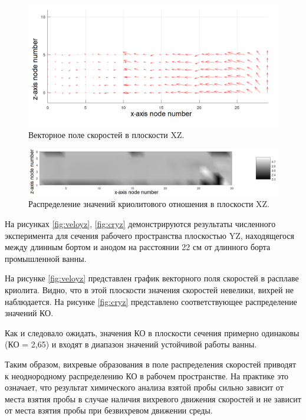 \documentclass[pdflatex,sn-mathphys-gost]{pmi-jnl}
\begin{document}
\begin{figure}[ht]
    \centering
    \includegraphics[width=\textwidth]{veloxz_art.png}
    \caption{Векторное поле скоростей в плоскости XZ.}
    \label{fig:veloxz}
\end{figure}

\begin{figure}[ht]
    \centering
    \includegraphics[width=\textwidth]{heatmapxz_art.png}
    \caption{Распределение значений криолитового отношения в плоскости XZ.}
    \label{fig:crxz}
\end{figure}

На рисунках \ref{fig:veloyz}, \ref{fig:cryz} демонстрируются результаты численного эксперимента для сечения рабочего пространства плоскостью YZ, находящегося между длинным бортом и анодом на расстоянии 22 см от длинного борта промышленной ванны.

На рисунке \ref{fig:veloyz} представлен график векторного поля скоростей в расплаве криолита. Видно, что в этой плоскости значения скоростей невелики, вихрей не наблюдается. На рисунке \ref{fig:cryz} представлено соответствующее распределение значений КО.

Как и следовало ожидать, значения КО в плоскости сечения примерно одинаковы (КО = 2,65) и входят в диапазон значений устойчивой работы ванны.

Таким образом, вихревые образования в поле распределения скоростей приводят к неоднородному распределению КО в рабочем пространстве. На практике это означает, что результат химического анализа взятой пробы сильно зависит от места взятия пробы в случае наличия вихревого движения скоростей и не зависит от места взятия пробы при безвихревом движении среды.
\end{document}
